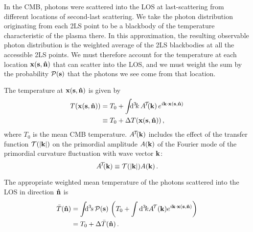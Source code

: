 \documentclass[fleqn,usenatbib]{mnras}
\begin{document}
    In the CMB, photons were scattered into the LOS at last-scattering from
    different locations of second-last scattering.  We take the photon
    distribution originating from each 2LS point to be a blackbody of the
    temperature characteristic of the plasma there.  In this approximation, the
    resulting observable photon distribution is the weighted average of the 2LS
    blackbodies at all the accessible 2LS points.  We must therefore account for
    the temperature at each location $\mathbf{x}(\mathbf{s},{\bf\hat{n}})$ that can scatter
    into the LOS, and we must weight the sum by the probability
    $\mathcal{P}(\mathbf{s})$ that the photons we see come from that
    location.\footnotemark

    The temperature at $\mathbf{x}(\mathbf{s}, {\bf\hat{n}})$ is given by
    \begin{align} \label{eqn:Tofx}
        T(\mbf{x}(\mbf{s}, \nhat))
            &=    
                  T_0
                + \int \!\!\!\dif[3]{k} \, A^{\!\mcal{T}\!\!}(\mbf{k}) \, \Exp{i \mbf{k} \cdot \mbf{x}(\mbf{s}, \nhat)} \\
            &\equiv
                  T_0
                + \DeltaT(\mbf{x}(\mbf{s}, \nhat))\,, \nonumber
    \end{align}
    where $T_0$ is the mean CMB temperature.  $A^{\!\mathcal{T}\!\!}(\mathbf{k})$
    includes the effect of the transfer function $\mathcal{T}(\lvert \mathbf{k} \rvert)$ on
    the primordial amplitude $A(\mathbf{k})$ of the Fourier mode of the primordial
    curvature fluctuation with wave vector $\mathbf{k}$:
    \begin{equation}
        A^{\!\mathcal{T}\!\!}(\mathbf{k})\equiv \mathcal{T}(\lvert \mathbf{k} \rvert) A(\mathbf{k}) \,.
    \end{equation}

    The appropriate weighted mean temperature of the photons scattered into the
    LOS in direction ${\bf\hat{n}}$ is
    \begin{align}
        \bar{T}(\nhat)
            &=
                \int\!\!\!\dif[3]{s}\, \mcal{P}(\mbf{s})\, \left(
                      T_0
                    + \int \dif[3]{k} A^{\!\mcal{T}}(\mbf{k}) \Exp{i\mbf{k}\cdot\mbf{x}(\mbf{s},\nhat)}
                \right)
            \\
            &=
                T_0 + \Delta \bar{T}(\nhat) \,.
    \end{align}
\end{document}
